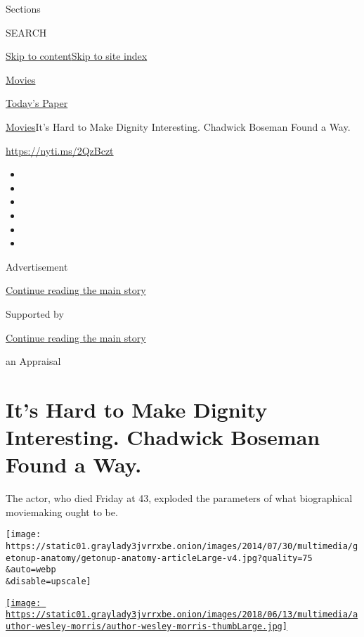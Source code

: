 Sections

SEARCH

\protect\hyperlink{site-content}{Skip to
content}\protect\hyperlink{site-index}{Skip to site index}

\href{https://www.nytimes3xbfgragh.onion/section/movies}{Movies}

\href{https://myaccount.nytimes3xbfgragh.onion/auth/login?response_type=cookie\&client_id=vi}{}

\href{https://www.nytimes3xbfgragh.onion/section/todayspaper}{Today's
Paper}

\href{/section/movies}{Movies}\textbar{}It's Hard to Make Dignity
Interesting. Chadwick Boseman Found a Way.

\url{https://nyti.ms/2QzBczt}

\begin{itemize}
\item
\item
\item
\item
\item
\item
\end{itemize}

Advertisement

\protect\hyperlink{after-top}{Continue reading the main story}

Supported by

\protect\hyperlink{after-sponsor}{Continue reading the main story}

an Appraisal

\hypertarget{its-hard-to-make-dignity-interesting-chadwick-boseman-found-a-way}{%
\section{It's Hard to Make Dignity Interesting. Chadwick Boseman Found a
Way.}\label{its-hard-to-make-dignity-interesting-chadwick-boseman-found-a-way}}

The actor, who died Friday at 43, exploded the parameters of what
biographical moviemaking ought to be.

\texttt{[image: https://static01.graylady3jvrrxbe.onion/images/2014/07/30/multimedia/getonup-anatomy/getonup-anatomy-articleLarge-v4.jpg?quality=75\\\&auto=webp\\\&disable=upscale]}

\href{https://www.nytimes3xbfgragh.onion/by/wesley-morris}{\texttt{[image: https://static01.graylady3jvrrxbe.onion/images/2018/06/13/multimedia/author-wesley-morris/author-wesley-morris-thumbLarge.jpg]}}

